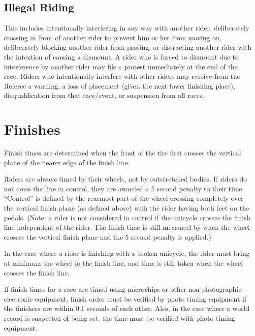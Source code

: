 \subsection{Illegal Riding}
This includes intentionally interfering in any way with another rider, deliberately crossing in front of another rider to prevent him or her from moving on, deliberately blocking another rider from passing, or distracting another rider with the intention of causing a dismount.
A rider who is forced to dismount due to interference by another rider may file a protest immediately at the end of the race.
Riders who intentionally interfere with other riders may receive from the Referee a warning, a loss of placement (given the next lower finishing place), disqualification from that race/event, or suspension from all races.

\section{Finishes}
Finish times are determined when the front of the tire first crosses the vertical plane of the nearer edge of the finish line.

Riders are always timed by their wheels, not by outstretched bodies.
If riders do not cross the line in control, they are awarded a 5 second penalty to their time.
``Control'' is defined by the rearmost part of the wheel crossing completely over the vertical finish plane (as defined above) with the rider having both feet on the pedals.
(Note: a rider is not considered in control if the unicycle crosses the finish line independent of the rider.
The finish time is still measured by when the wheel crosses the vertical finish plane and the 5 second penalty is applied.)

In the case where a rider is finishing with a broken unicycle, the rider must bring at minimum the wheel to the finish line, and time is still taken when the wheel crosses the finish line.

If finish times for a race are timed using microchips or other non-photographic electronic equipment, finish order must be verified by photo timing equipment if the finishers are within 0.1 seconds of each other.
Also, in the case where a world record is suspected of being set, the time must be verified with photo timing equipment.

